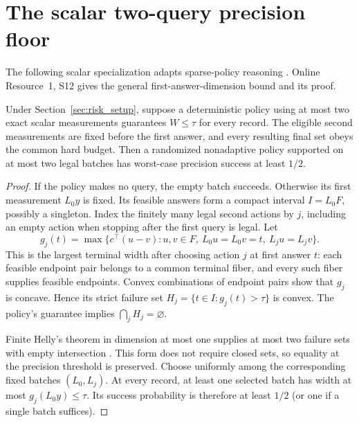 \section{The scalar two-query precision floor}
The following scalar specialization adapts sparse-policy reasoning
\citep[Theorem~2 and Example~5]{kurtz2026}. Online Resource~1, S12 gives
the general first-answer-dimension bound and its proof.

\begin{theorem}
\label{thm:helly-precision}
Under Section~\ref{sec:risk_setup}, suppose a deterministic policy using
at most two exact scalar measurements guarantees $W\leq\tau$ for every
record. The eligible second measurements are fixed before the first
answer, and every resulting final set obeys the common hard budget.
Then a randomized nonadaptive policy supported on at most two legal
batches has worst-case precision success at least $1/2$.
\end{theorem}
\begin{proof}
If the policy makes no query, the empty batch succeeds. Otherwise its
first measurement $L_0y$ is fixed. Its feasible answers form a compact
interval $I=L_0F$, possibly a singleton. Index the finitely many legal
second actions by $j$, including an empty action when stopping after the
first query is legal. Let
\[
 g_j(t)=\max\{c^\top(u-v):u,v\in F,\ L_0u=L_0v=t,
                                      \ L_ju=L_jv\}.
\]
This is the largest terminal width after choosing action $j$ at first
answer $t$: each feasible endpoint pair belongs to a common terminal
fiber, and every such fiber supplies feasible endpoints. Convex
combinations of endpoint pairs show that $g_j$ is concave. Hence its
strict failure set $H_j=\{t\in I:g_j(t)>\tau\}$ is convex.
The policy's guarantee implies $\bigcap_j H_j=\varnothing$.

Finite Helly's theorem in dimension at most one supplies at most two
failure sets with empty intersection \citep[Theorem~1.1]{amenta2016}.
This form does not require closed sets, so equality at the precision
threshold is preserved. Choose uniformly among the corresponding
fixed batches $(L_0,L_j)$. At every record, at least one selected batch
has width at most $g_j(L_0y)\leq\tau$. Its success probability is
therefore at least $1/2$ (or one if a single batch suffices).
\end{proof}
